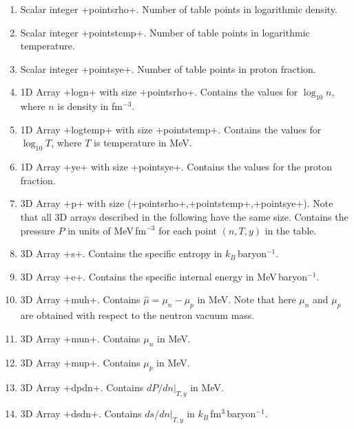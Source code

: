 \documentclass[letterpaper,11pt]{refart}
\begin{document}
\begin{enumerate}
 \item Scalar integer \verbprm+pointsrho+. Number of table points in
   logarithmic density.

 \item Scalar integer \verbprm+pointstemp+. Number of table points in
   logarithmic temperature.

 \item Scalar integer \verbprm+pointsye+. Number of table points in
   proton fraction.

 \item 1D Array
   \verbprm+logn+ with size \verbprm+pointsrho+. Contains the values for
   $\log_{10}n$, where $n$ is density in fm$^{-3}$.

 \item 1D Array \verbprm+logtemp+ with size
   \verbprm+pointstemp+. Contains the values for $\log_{10}T$, where
   $T$ is temperature in MeV.

 \item 1D Array \verbprm+ye+ with size \verbprm+pointsye+. Contains
   the values for the proton fraction.
   

 \item 3D Array \verbprm+p+ with size
   (\verbprm+pointsrho+,\verbprm+pointstemp+,\verbprm+pointsye+). Note
   that all 3D arrays described in the following have the same
   size. Contains the pressure $P$ in units of MeV\,fm$^{-3}$ for each
   point $(n,T,y)$ in the table.

 \item 3D Array \verbprm+s+. Contains the specific entropy in
   $k_B$\,baryon$^{-1}$.

 \item 3D Array \verbprm+e+. Contains the specific internal energy in
   MeV\,baryon$^{-1}$.

 \item 3D Array \verbprm+muh+. Contains $\hat\mu=\mu_n-\mu_p$ in MeV. 
   Note that here $\mu_n$ and $\mu_p$ are obtained with respect to the neutron vacuum mass. 
   
 \item 3D Array \verbprm+mun+. Contains $\mu_n$ in MeV. 

 \item 3D Array \verbprm+mup+. Contains $\mu_p$ in MeV.

 \item 3D Array \verbprm+dpdn+. Contains $dP/dn\vert_{T,y}$ in MeV.  

 \item 3D Array \verbprm+dsdn+. Contains $ds/dn\vert_{T,y}$ in
 $k_B$\,fm$^3$\,baryon$^{-1}$. 


\end{enumerate}
\end{document}
